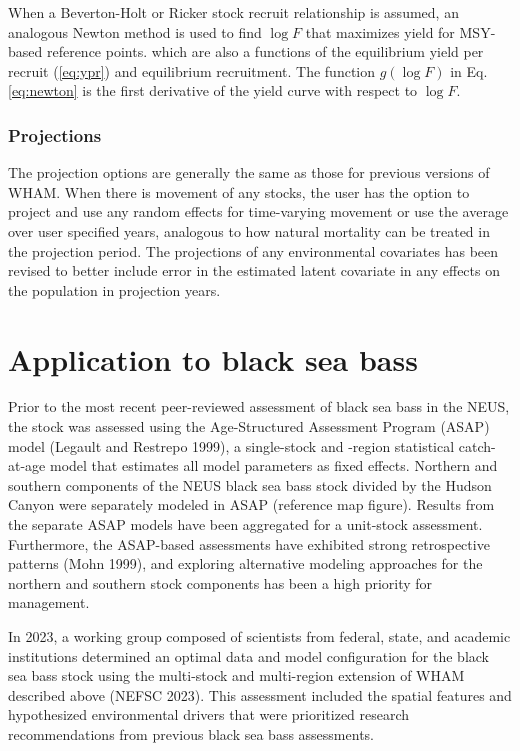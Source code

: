 \documentclass[
]{article}
\begin{document}
When a Beverton-Holt or Ricker stock recruit relationship is assumed, an
analogous Newton method is used to find \(\log F\) that maximizes yield
for MSY-based reference points. which are also a functions of the
equilibrium yield per recruit (\ref{eq:ypr}) and equilibrium
recruitment. The function \(g(\log F)\) in Eq. \ref{eq:newton} is the
first derivative of the yield curve with respect to \(\log F\).

\hypertarget{projections}{%
\subsubsection*{Projections}\label{projections}}

The projection options are generally the same as those for previous
versions of WHAM. When there is movement of any stocks, the user has the
option to project and use any random effects for time-varying movement
or use the average over user specified years, analogous to how natural
mortality can be treated in the projection period. The projections of
any environmental covariates has been revised to better include error in
the estimated latent covariate in any effects on the population in
projection years.

\hypertarget{application-to-black-sea-bass}{%
\section*{Application to black sea
bass}\label{application-to-black-sea-bass}}

Prior to the most recent peer-reviewed assessment of black sea bass in
the NEUS, the stock was assessed using the Age-Structured Assessment
Program (ASAP) model (Legault and Restrepo 1999), a single-stock and
-region statistical catch-at-age model that estimates all model
parameters as fixed effects. Northern and southern components of the
NEUS black sea bass stock divided by the Hudson Canyon were separately
modeled in ASAP (reference map figure). Results from the separate ASAP
models have been aggregated for a unit-stock assessment. Furthermore,
the ASAP-based assessments have exhibited strong retrospective patterns
(Mohn 1999), and exploring alternative modeling approaches for the
northern and southern stock components has been a high priority for
management.

In 2023, a working group composed of scientists from federal, state, and
academic institutions determined an optimal data and model configuration
for the black sea bass stock using the multi-stock and multi-region
extension of WHAM described above (NEFSC 2023). This assessment included
the spatial features and hypothesized environmental drivers that were
prioritized research recommendations from previous black sea bass
assessments.
\end{document}
